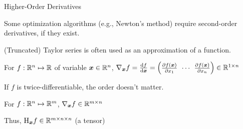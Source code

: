 \documentclass[handout,fleqn,aspectratio=169]{beamer}
\begin{document}
\begin{frame}{Higher-Order Derivatives}

\plitemsep 0.05in

\bci 
\item Some optimization algorithms (e.g., Newton's method) require second-order derivatives, if they exist. 
\item (Truncated) Taylor series is often used as an approximation of a function. 

\item For $f: {\mathbb R}^{n} \mapsto {\mathbb R}$ of variable $\bm{x} \in {\mathbb R}^{n}$, $
\grad_{\vec{x}} f = \d{f}{\vec{x}} = 
\rowvec{\pd{f(\vec{x})}{x_1} & \cdots & \pd{f(\vec{x})}{x_n}} \in \real^{1 \times n}
$
\bci
\item If $f$ is twice-differentiable, the order doesn't matter. 
\eci

\item For $f: {\mathbb R}^{n} \mapsto {\mathbb R}^{m}$, $\nabla _{\bm{x}} f \in {\mathbb R}^{m \times n}$
\bci
\item Thus, $\text{H} _{\bm{x}} f \in {\mathbb R}^{m \times n \times n}$ (a tensor)
\eci

\eci
\end{frame}

\end{document}

